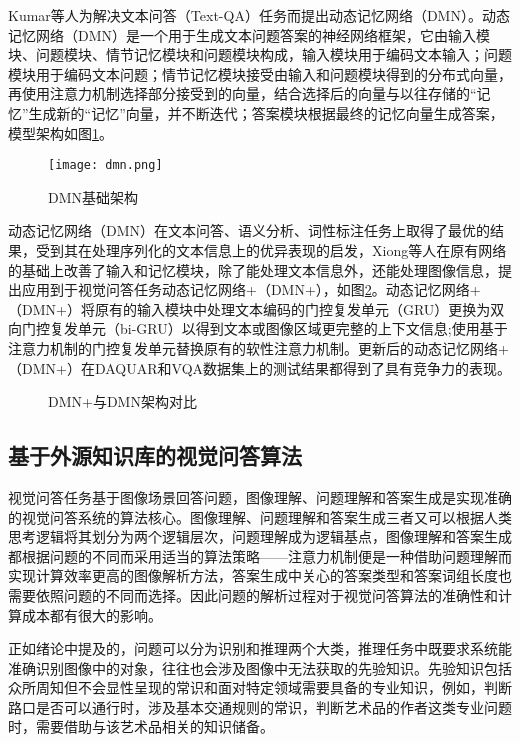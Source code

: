 Kumar等人为解决文本问答（Text-QA）任务而提出动态记忆网络（DMN）。动态记忆网络（DMN）是一个用于生成文本问题答案的神经网络框架，它由输入模块、问题模块、情节记忆模块和问题模块构成，输入模块用于编码文本输入；问题模块用于编码文本问题；情节记忆模块接受由输入和问题模块得到的分布式向量，再使用注意力机制选择部分接受到的向量，结合选择后的向量与以往存储的“记忆”生成新的“记忆”向量，并不断迭代；答案模块根据最终的记忆向量生成答案，模型架构如图\ref{dmn}。
\begin{figure}[H]
	\centering
	\texttt{[image: dmn.png]}
	\caption{DMN基础架构}
	\label{dmn}
\end{figure}

动态记忆网络（DMN）在文本问答、语义分析、词性标注任务上取得了最优的结果，受到其在处理序列化的文本信息上的优异表现的启发，Xiong等人在原有网络的基础上改善了输入和记忆模块，除了能处理文本信息外，还能处理图像信息，提出应用到于视觉问答任务动态记忆网络+（DMN+），如图\ref{v-dmn}。动态记忆网络+（DMN+）将原有的输入模块中处理文本编码的门控复发单元（GRU）更换为双向门控复发单元（bi-GRU）以得到文本或图像区域更完整的上下文信息;使用基于注意力机制的门控复发单元替换原有的软性注意力机制。更新后的动态记忆网络+（DMN+）在DAQUAR和VQA数据集上的测试结果都得到了具有竞争力的表现。
\begin{figure}[H]
	\centering
	\caption{DMN+与DMN架构对比}
	\label{v-dmn}
\end{figure}

\subsection{基于外源知识库的视觉问答算法}
视觉问答任务基于图像场景回答问题，图像理解、问题理解和答案生成是实现准确的视觉问答系统的算法核心。图像理解、问题理解和答案生成三者又可以根据人类思考逻辑将其划分为两个逻辑层次，问题理解成为逻辑基点，图像理解和答案生成都根据问题的不同而采用适当的算法策略——注意力机制便是一种借助问题理解而实现计算效率更高的图像解析方法，答案生成中关心的答案类型和答案词组长度也需要依照问题的不同而选择。因此问题的解析过程对于视觉问答算法的准确性和计算成本都有很大的影响。

正如绪论中提及的，问题可以分为识别和推理两个大类，推理任务中既要求系统能准确识别图像中的对象，往往也会涉及图像中无法获取的先验知识。先验知识包括众所周知但不会显性呈现的常识和面对特定领域需要具备的专业知识，例如，判断路口是否可以通行时，涉及基本交通规则的常识，判断艺术品的作者这类专业问题时，需要借助与该艺术品相关的知识储备。

